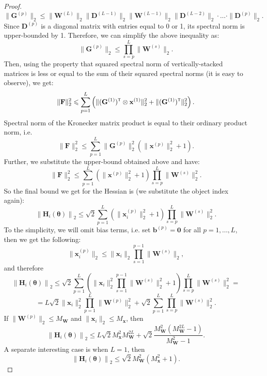 \documentclass{article}
\begin{document}
\begin{proof}
    \[ \| \mathbf{G}^{(p)} \|_2 \leqslant \|\mathbf{W}^{(L)}\|_2 \|\mathbf{D}^{(L-1)}\|_2 \|\mathbf{W}^{(L-1)}\|_2 \|\mathbf{D}^{(L-2)}\|_2 \cdot \ldots \cdot \|\mathbf{D}^{(p)}\|_2. \]
    Since $\mathbf{D}^{(p)}$ is a diagonal matrix with entries equal to 0 or 1, its spectral norm is upper-bounded by 1. Therefore, we can simplify the above inequality as:
    \[ \| \mathbf{G}^{(p)} \|_2 \leqslant \prod_{s=p}^{L} \| \mathbf{W}^{(s)} \|_2. \]
    Then, using the property that squared spectral norm of vertically-stacked matrices is less or equal to the sum of their squared spectral norms (it is easy to observe), we get:
    \[ \| \mathbf{F} \|_2^2 \leqslant \sum\limits_{p=1}^{L} \left( \| (\mathbf{G}^{(1)})\T \otimes \mathbf{x}^{(1)} \|_2^2 + \| (\mathbf{G}^{(1)})\T \|_2^2 \right). \]
    Spectral norm of the Kronecker matrix product is equal to their ordinary product norm, i.e.
    \[ \| \mathbf{F} \|_2^2 \leqslant \sum\limits_{p=1}^{L} \| \mathbf{G}^{(p)} \|_2^2 \left(\| \mathbf{x}^{(p)} \|_2^2 + 1\right). \]
    Further, we substitute the upper-bound obtained above and have:
    \[ \| \mathbf{F} \|_2^2 \leqslant \sum\limits_{p=1}^{L} \left(\| \mathbf{x}^{(p)} \|_2^2 + 1\right) \prod_{s=p}^{L} \| \mathbf{W}^{(s)} \|_2^2 . \]
    So the final bound we get for the Hessian is (we substitute the object index again):
    \[ \left\| \mathbf{H}_i(\boldsymbol{\theta}) \right\|_2 \leqslant \sqrt{2} \sum\limits_{p=1}^{L} \left(\| \mathbf{x}_i^{(p)} \|_2^2 + 1\right) \prod_{s=p}^{L} \| \mathbf{W}^{(s)} \|_2^2 . \]
    To the simplicity, we will omit bias terms, i.e. set $\mathbf{b}^{(p)} = \mathbf{0}$ for all $p = 1, \ldots, L$, then we get the following:
    \[ \| \mathbf{x}_i^{(p)} \|_2 \leqslant \| \mathbf{x}_i \|_2 \prod_{s=1}^{p-1} \| \mathbf{W}^{(s)} \|_2, \]
    and therefore
    \[ \left\| \mathbf{H}_i(\boldsymbol{\theta}) \right\|_2 \leqslant \sqrt{2} \sum\limits_{p=1}^{L} \left( \| \mathbf{x}_i \|_2^2 \prod_{s=1}^{p-1} \| \mathbf{W}^{(s)} \|_2^2 + 1\right) \prod_{s=p}^{L} \| \mathbf{W}^{(s)} \|_2^2 = \]
    \[ = L \sqrt{2} \| \mathbf{x}_i \|_2^2 \prod_{p=1}^{L} \| \mathbf{W}^{(p)} \|_2^2 + \sqrt{2} \sum\limits_{p=1}^{L} \prod_{s=p}^{L} \| \mathbf{W}^{(s)} \|_2^2. \]
    If $\| \mathbf{W}^{(p)} \|_2 \leqslant M_{\mathbf{W}}$ and $\| \mathbf{x}_i \|_2 \leqslant M_{\mathbf{x}}$, then
        \[ \left\| \mathbf{H}_i(\boldsymbol{\theta}) \right\|_2 \leqslant L \sqrt{2} M_{\mathbf{x}}^2 M_{\mathbf{W}}^{2L} + \sqrt{2} \dfrac{M_{\mathbf{W}}^2 (M_{\mathbf{W}}^{2L} - 1)}{M_{\mathbf{W}}^2 - 1}. \]
    A separate interesting case is when $L = 1$, then
    \[ \left\| \mathbf{H}_i(\boldsymbol{\theta}) \right\|_2 \leqslant \sqrt{2} M_{\mathbf{W}}^{2} \left( M_{\mathbf{x}}^2 + 1 \right) . \]
\end{proof}
\end{document}
